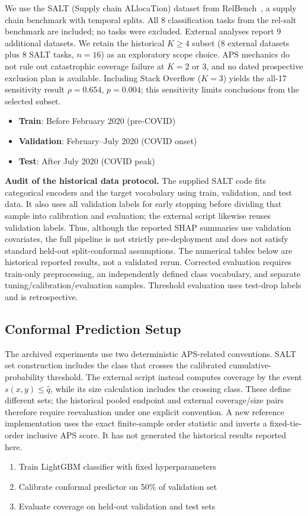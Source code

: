 \documentclass[accepted]{uai2026} %
\begin{document}
We use the SALT (Supply chain ALlocaTion) dataset from RelBench~\citep{fey2024relbench}, a supply chain benchmark with temporal splits. All 8 classification tasks from the rel-salt benchmark are included; no tasks were excluded.
External analyses report 9 additional datasets. We retain the historical $K\geq4$ subset (8 external datasets plus 8 SALT tasks, $n=16$) as an exploratory scope choice. APS mechanics do not rule out catastrophic coverage failure at $K=2$ or $3$, and no dated prospective exclusion plan is available. Including Stack Overflow ($K=3$) yields the all-17 sensitivity result $\rho=0.654$, $p=0.004$; this sensitivity limits conclusions from the selected subset.
\begin{itemize}
    \item \textbf{Train}: Before February 2020 (pre-COVID)
    \item \textbf{Validation}: February--July 2020 (COVID onset)
    \item \textbf{Test}: After July 2020 (COVID peak)
\end{itemize}

\noindent\textbf{Audit of the historical data protocol.} The supplied SALT code fits categorical encoders and the target vocabulary using train, validation, and test data. It also uses all validation labels for early stopping before dividing that sample into calibration and evaluation; the external script likewise reuses validation labels. Thus, although the reported SHAP summaries use validation covariates, the full pipeline is not strictly pre-deployment and does not satisfy standard held-out split-conformal assumptions. The numerical tables below are historical reported results, not a validated rerun. Corrected evaluation requires train-only preprocessing, an independently defined class vocabulary, and separate tuning/calibration/evaluation samples. Threshold evaluation uses test-drop labels and is retrospective.

\subsection{Conformal Prediction Setup}

The archived experiments use two deterministic APS-related conventions. SALT set construction includes the class that crosses the calibrated cumulative-probability threshold. The external script instead computes coverage by the event $s(x,y)\leq\hat q$, while its size calculation includes the crossing class. These define different sets; the historical pooled endpoint and external coverage/size pairs therefore require reevaluation under one explicit convention. A new reference implementation uses the exact finite-sample order statistic and inverts a fixed-tie-order inclusive APS score. It has not generated the historical results reported here.
\begin{enumerate}
    \item Train LightGBM classifier with fixed hyperparameters
    \item Calibrate conformal predictor on 50\% of validation set
    \item Evaluate coverage on held-out validation and test sets
\end{enumerate}
\end{document}
